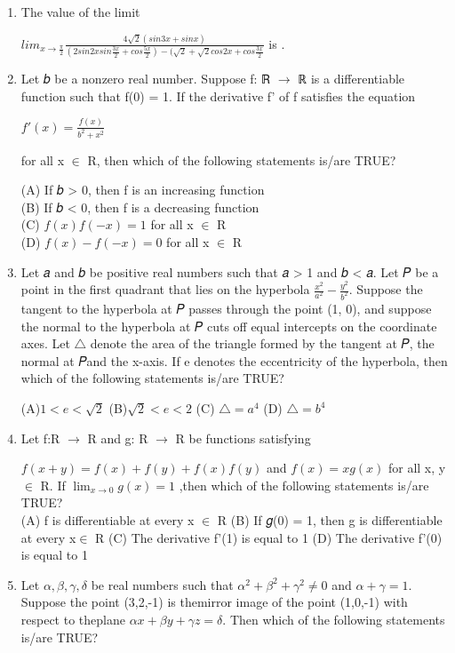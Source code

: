 \documentclass{article}
\begin{document}
\begin{enumerate}
\item The value of the limit
         
	 $lim_{x \to \frac{\pi}{2}}\frac{4\sqrt{2}(sin3x + sinx)}{(2 sin2xsin\frac{3x}{2} + cos\frac{5x}{2}) - (\sqrt{2}+\sqrt{2}cos2x + cos\frac{3x}{2}}$ is \underline{\hspace{1cm}}.

\item Let 𝑏 be a nonzero real number. Suppose f: ℝ $\to$ ℝ is a differentiable function such that f(0) = 1.
If the derivative f' of f satisfies the equation
               
	       $f'(x) = \frac{f(x)}{b^2 + x^2}$
	       
for all x $\in$ R, then which of the following statements is/are TRUE?

(A) If 𝑏 > 0, then f is an increasing function\\
(B) If 𝑏 < 0, then f is a decreasing function \\
(C) $f(x)f(-x) = 1$ for all x $\in$ R\\
(D) $f(x) - f(-x) = 0$ for all x $\in$ R

\item Let 𝑎 and 𝑏 be positive real numbers such that 𝑎 > 1 and 𝑏 < 𝑎. Let 𝑃 be a point in the first quadrant that lies on the hyperbola $\frac{x^2}{a^2} - \frac{y^2}{b^2}$. Suppose the tangent to the hyperbola at 𝑃 passes through the point (1, 0), and suppose the normal to the hyperbola at 𝑃 cuts off equal intercepts on the coordinate axes. Let $\triangle$ denote the area of the triangle formed by the tangent at 𝑃, the normal at 𝑃and the x-axis. If e denotes the eccentricity of the hyperbola, then which of the following statements is/are TRUE?

(A)$1< e <\sqrt{2}$  
(B)$\sqrt{2}< e <2$  
(C) $\triangle = a^4$ 
(D) $\triangle = b^4$

\item Let f:R $\to$ R and g: R $\to$ R be functions satisfying

$f(x + y) = f(x) + f(y) + f(x)f(y)$ and $f(x) = xg(x)$
for all x, y $\in$ R. If $\lim_{x \to 0}g(x) = 1$
,then which of the following statements is/are TRUE?\\

(A) f is differentiable at every x $\in$ R
(B) If 𝑔(0) = 1, then g is differentiable at every x$\in$ R
(C) The derivative f'(1) is equal to 1
(D) The derivative f'(0) is equal to 1

\item Let $\alpha,\beta,\gamma,\delta$ be real numbers such that $\alpha^2 + \beta^2 + \gamma^2 \neq 0$ and $\alpha + \gamma = 1$. Suppose the point (3,2,-1) is themirror image of the point (1,0,-1) with respect to theplane ${\alpha}x + {\beta}y + {\gamma}z = \delta$. 
Then which of the following statements is/are TRUE?\\


\end{enumerate}
\end{document}
